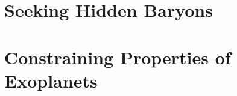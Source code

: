 \documentclass[oneside,openright,letterpaper,12pt]{report}
\begin{document}

\pagestyle{empty}




\cleardoublepage
\pagestyle{plain}
\setcounter{page}{1}

\setlength{\baselineskip}{0.625 \baselineskip}

{\parskip=0.15cm
  \tableofcontents
  \cleardoublepage
  \listoffigures
  \cleardoublepage
  \listoftables
}

\setlength{\baselineskip}{1.6 \baselineskip}

{
  \cleardoublepage
  
  \cleardoublepage
}


\pagestyle{myheadings}
\markright{}
\setcounter{page}{1}

\part[Seeking Hidden Baryons]{Seeking Hidden Baryons}
\label{part:IGM}

\part[Constraining Properties of Exoplanets]{Constraining Properties of Exoplanets}
\label{part:planets}






\cleardoublepage

\setlength{\baselineskip}{0.625 \baselineskip}


\cleardoublepage
\end{document}
